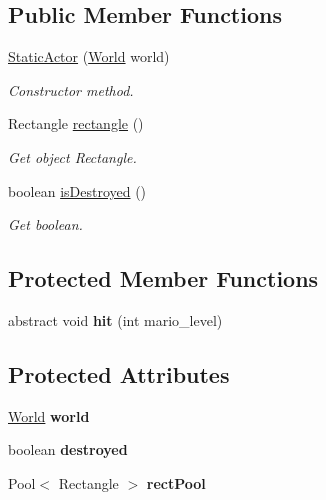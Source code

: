 \subsection*{Public Member Functions}
\begin{DoxyCompactItemize}
\item 
\hyperlink{classnl_1_1arjanfrans_1_1mario_1_1model_1_1StaticActor_aa558f637b07d753909e51f5cebe6168c}{Static\+Actor} (\hyperlink{classnl_1_1arjanfrans_1_1mario_1_1model_1_1World}{World} world)
\begin{DoxyCompactList}\small\item\em Constructor method. \end{DoxyCompactList}\item 
Rectangle \hyperlink{classnl_1_1arjanfrans_1_1mario_1_1model_1_1StaticActor_a39be7695e6cb67d19267dd5c6ae5e264}{rectangle} ()
\begin{DoxyCompactList}\small\item\em Get object Rectangle. \end{DoxyCompactList}\item 
boolean \hyperlink{classnl_1_1arjanfrans_1_1mario_1_1model_1_1StaticActor_af44668107f69c1ec7547a7fb36537c43}{is\+Destroyed} ()
\begin{DoxyCompactList}\small\item\em Get boolean. \end{DoxyCompactList}\end{DoxyCompactItemize}
\subsection*{Protected Member Functions}
\begin{DoxyCompactItemize}
\item 
\mbox{\label{classnl_1_1arjanfrans_1_1mario_1_1model_1_1StaticActor_a2cb4aa1c38965ace19ec77a38e599afc}} 
abstract void {\bfseries hit} (int mario\+\_\+level)
\end{DoxyCompactItemize}
\subsection*{Protected Attributes}
\begin{DoxyCompactItemize}
\item 
\mbox{\label{classnl_1_1arjanfrans_1_1mario_1_1model_1_1StaticActor_ae4707b92f60b23175bc3850faa27e7d6}} 
\hyperlink{classnl_1_1arjanfrans_1_1mario_1_1model_1_1World}{World} {\bfseries world}
\item 
\mbox{\label{classnl_1_1arjanfrans_1_1mario_1_1model_1_1StaticActor_a0b8cdccbd26a618eab8963d47397c607}} 
boolean {\bfseries destroyed}
\item 
Pool$<$ Rectangle $>$ {\bfseries rect\+Pool}
\end{DoxyCompactItemize}


